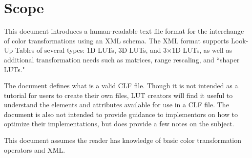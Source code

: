 \cleardoublepage
\numberedformat	
\chapter{Scope} 	%

This document introduces a human-readable text file format for the interchange of color transformations using an XML schema. The XML format supports Look-Up Tables of several types: 1D LUTs, 3D LUTs, and 3$\times$1D LUTs, as well as additional transformation needs such as matrices, range rescaling, and ``shaper LUTs." 

The document defines what is a valid CLF file. Though it is not intended as a tutorial for users to create their own files, LUT creators will find it useful to understand the elements and attributes available for use in a CLF file. The document is also not intended to provide guidance to implementors on how to optimize their implementations, but does provide a few notes on the subject.

This document assumes the reader has knowledge of basic color transformation operators and XML.
